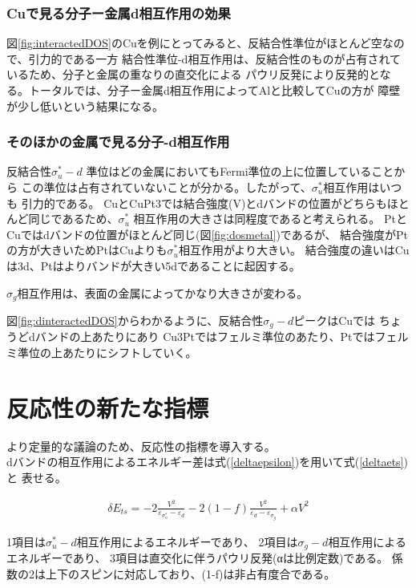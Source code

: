 \documentclass[12pt]{ltjsarticle}
\begin{document}
\subsubsection{Cuで見る分子ー金属d相互作用の効果}
図\ref{fig:interactedDOS}のCuを例にとってみると、反結合性準位がほとんど空なので、引力的である一方
結合性準位-d相互作用は、反結合性のものが占有されているため、分子と金属の重なりの直交化による
パウリ反発により反発的となる。トータルでは、分子ー金属d相互作用によってAlと比較してCuの方が
障壁が少し低いという結果になる。

\subsubsection{そのほかの金属で見る分子-d相互作用}
反結合性$ \sigma _u ^* -d$ 準位はどの金属においてもFermi準位の上に位置していることから
この準位は占有されていないことが分かる。したがって、$ \sigma _u ^*$相互作用はいつも
引力的である。
CuとCuPt3では結合強度(V)とdバンドの位置がどちらもほとんど同じであるため、$ \sigma _u ^*$
相互作用の大きさは同程度であると考えられる。
PtとCuではdバンドの位置がほとんど同じ(図\ref{fig:dosmetal})であるが、
結合強度がPtの方が大きいためPtはCuよりも$ \sigma _u ^*$相互作用がより大きい。
結合強度の違いはCuは3d、Ptはよりバンドが大きい5dであることに起因する。

$\sigma _g$相互作用は、表面の金属によってかなり大きさが変わる。

図\ref{fig:dinteractedDOS}からわかるように、反結合性$\sigma _g -d$ピークはCuでは
ちょうどdバンドの上あたりにあり
Cu3Ptではフェルミ準位のあたり、Ptではフェルミ準位の上あたりにシフトしていく。

\section{反応性の新たな指標}
より定量的な議論のため、反応性の指標を導入する。\\
dバンドの相互作用によるエネルギー差は式(\ref{deltaepsilon})を用いて式(\ref{deltaets})と
表せる。

\begin{eqnarray}
    \label{deltaets}
    \delta E_{ts} = -2 \frac{ V^2 }{\varepsilon _{\sigma_u^*} - \varepsilon _d}
                    -2(1-f)\frac{V^2}{\varepsilon _d - \varepsilon _{\sigma_g}}
                    + \alpha V^2
\end{eqnarray}

1項目は$\sigma _u ^* -d$相互作用によるエネルギーであり、
2項目は$\sigma _g -d$相互作用によるエネルギーであり、
3項目は直交化に伴うパウリ反発(αは比例定数)である。
係数の2は上下のスピンに対応しており、(1-f)は非占有度合である。
\end{document}
